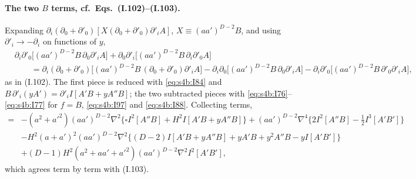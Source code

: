 \documentclass[aps,prd,onecolumn,10pt,nofootinbib,floatfix]{revtex4-2}
\newcommand{\eqI}[1]{(I.#1)}
\begin{document}
\paragraph*{The two $B$ terms, cf.\ Eqs.~(I.102)--(I.103).}
Expanding $\partial_i(\partial_0+\partial'_0)[X(\partial_0+\partial'_0)\partial'_iA]$, $X\equiv(aa')^{D-2}B$, and using
$\partial'_i\to-\partial_i$ on functions of $y$,
\begin{equation}
\begin{split}
&\partial_i\partial'_0\big[(aa')^{D-2}B\,\partial_0\partial'_iA\big]+\partial_0\partial'_i\big[(aa')^{D-2}B\,\partial_i\partial'_0A\big]\\
&\qquad=\partial_i(\partial_0+\partial'_0)\big[(aa')^{D-2}B\,(\partial_0+\partial'_0)\partial'_iA\big]
-\partial_i\partial_0\big[(aa')^{D-2}B\,\partial_0\partial'_iA\big]-\partial_i\partial'_0\big[(aa')^{D-2}B\,\partial'_0\partial'_iA\big],
\end{split}
\label{eq:s4b:I102}
\end{equation}
as in \eqI{102}. The first piece is reduced with \eqref{eq:s4b:I84} and
$B\,\partial'_i(yA')=\partial'_iI[A'B+yA''B]$; the two subtracted pieces with \eqref{eq:s4b:I76}--\eqref{eq:s4b:I77} for
$f=B$, \eqref{eq:s4b:I97} and \eqref{eq:s4b:I88}. Collecting terms,
\begin{equation}
\begin{split}
={}&-(a^2+a'^2)(aa')^{D-2}\nabla^2\big\{\square I^2[A''B]+H^2I[A'B+yA''B]\big\}
+(aa')^{D-2}\nabla^4\big\{2I^2[A''B]-\tfrac12I^3[A'B']\big\}\\
&-H^2(a+a')^2(aa')^{D-2}\nabla^2\big\{(D-2)I[A'B+yA''B]+yA'B+y^2A''B-yI[A'B']\big\}\\
&+(D-1)H^2(a^2+aa'+a'^2)(aa')^{D-2}\nabla^2I^2[A'B'],
\end{split}
\label{eq:s4b:I103}
\end{equation}
which agrees term by term with \eqI{103}.
\end{document}
